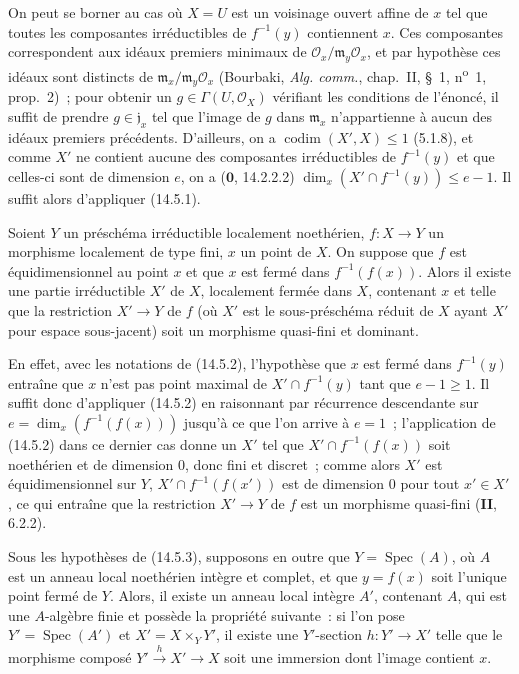 
On peut se borner au cas où $X=U$ est un voisinage ouvert affine de $x$ tel que
toutes les composantes irréductibles de $f^{-1}(y)$ contiennent $x$. Ces
composantes correspondent aux idéaux premiers minimaux de
$\mathcal O_x/\mathfrak m_y\mathcal O_x$, et par hypothèse ces idéaux sont
distincts de $\mathfrak m_x/\mathfrak m_y\mathcal O_x$ (Bourbaki,
\emph{Alg. comm.}, chap.~II, \S~1, n\textsuperscript{o}~1, prop.~2)~; pour obtenir
un $g\in\Gamma(U,\mathcal O_X)$ vérifiant les conditions de l'énoncé, il suffit de
prendre $g\in\mathfrak j_x$ tel que l'image de $g$ dans $\mathfrak m_x$
n'appartienne à aucun des idéaux premiers précédents. D'ailleurs, on a
$\operatorname{codim}(X',X)\leq 1$ (5.1.8), et comme $X'$ ne contient aucune des composantes
irréductibles de $f^{-1}(y)$ et que celles-ci sont de dimension $e$, on a
($\mathbf 0$, 14.2.2.2) $\dim_x(X'\cap f^{-1}(y))\leq e-1$. Il suffit alors
d'appliquer (14.5.1).

\begin{proposition}[14.5.3]
\label{IV.14.5.3-fr}
Soient $Y$ un préschéma irréductible localement noethérien, $f:X\to Y$ un
morphisme localement de type fini, $x$ un point de $X$. On suppose que $f$ est
équidimensionnel au point $x$ et que $x$ est fermé dans $f^{-1}(f(x))$. Alors il
existe une partie irréductible $X'$ de $X$, localement fermée dans $X$, contenant
$x$ et telle que la restriction $X'\to Y$ de $f$ (où $X'$ est le sous-préschéma
réduit de $X$ ayant $X'$ pour espace sous-jacent) soit un morphisme quasi-fini et
dominant.
\end{proposition}

En effet, avec les notations de (14.5.2), l'hypothèse que $x$ est fermé dans
$f^{-1}(y)$ entraîne que $x$ n'est pas point maximal de $X'\cap f^{-1}(y)$ tant
que $e-1\geq 1$. Il suffit donc d'appliquer (14.5.2) en raisonnant par récurrence
descendante sur $e=\dim_x(f^{-1}(f(x)))$ jusqu'à ce que l'on arrive à $e=1$~;
l'application de (14.5.2) dans ce dernier cas donne un $X'$ tel que
$X'\cap f^{-1}(f(x))$ soit noethérien et de dimension 0, donc fini et discret~;
comme alors $X'$ est équidimensionnel sur $Y$, $X'\cap f^{-1}(f(x'))$ est de
dimension 0 pour tout $x'\in X'$, ce qui entraîne que la restriction $X'\to Y$ de
$f$ est un morphisme quasi-fini (\textbf{II}, 6.2.2).

\begin{corollary}[14.5.4]
\label{IV.14.5.4-fr}
Sous les hypothèses de (14.5.3), supposons en outre que $Y=\operatorname{Spec}(A)$, où $A$ est
un anneau local noethérien intègre et complet, et que $y=f(x)$ soit l'unique point
fermé de $Y$. Alors, il existe un anneau local intègre $A'$, contenant $A$, qui est
une $A$-algèbre finie et possède la propriété suivante~: si l'on pose
$Y'=\operatorname{Spec}(A')$ et $X'=X\times_Y Y'$, il existe une $Y'$-section $h:Y'\to X'$ telle
que le morphisme composé $Y'\xrightarrow{h}X'\to X$ soit une immersion dont
l'image contient $x$.
\end{corollary}


